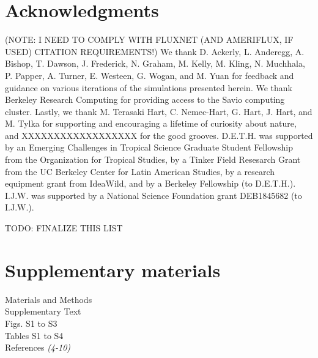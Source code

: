 \documentclass[12pt]{article}
\begin{document}






\section*{Acknowledgments}

(NOTE: I NEED TO COMPLY WITH FLUXNET (AND AMERIFLUX, IF USED) CITATION REQUIREMENTS!) We thank D. Ackerly, L. Anderegg, A. Bishop, T. Dawson, J. Frederick, N. Graham, M. Kelly, M. Kling, N. Muchhala, P. Papper, A. Turner, E. Westeen, G. Wogan, and M. Yuan for feedback and guidance on various iterations of the simulations presented herein. We thank Berkeley Research Computing for providing access to the Savio computing cluster. Lastly, we thank M. Terasaki Hart, C. Nemec-Hart, G. Hart, J. Hart, and M. Tylka for supporting and encouraging a lifetime of curiosity about nature, and XXXXXXXXXXXXXXXXXX for the good grooves. D.E.T.H. was supported by an Emerging Challenges in Tropical Science Graduate Student Fellowship from the Organization for Tropical Studies, by a Tinker Field Resesarch Grant from the UC Berkeley Center for Latin American Studies, by a research equipment grant from IdeaWild, and by a Berkeley Fellowship (to D.E.T.H.). I.J.W. was supported by a National Science Foundation grant DEB1845682 (to I.J.W.).

TODO: FINALIZE THIS LIST
\section*{Supplementary materials}
Materials and Methods\\
Supplementary Text\\
Figs. S1 to S3\\
Tables S1 to S4\\
References \textit{(4-10)}


\end{document}

